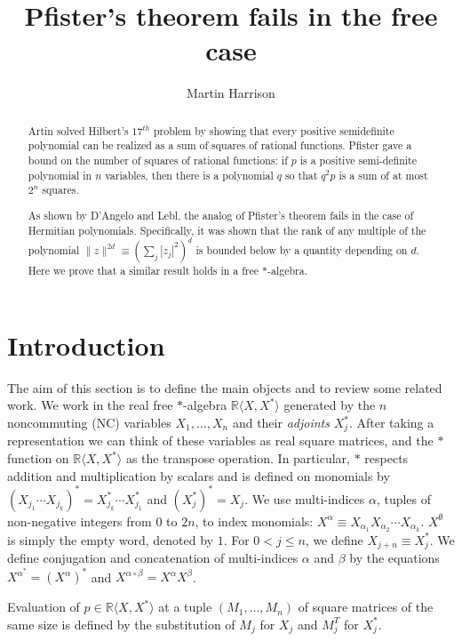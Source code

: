 \documentclass[11pt]{amsart}
\title{Pfister's theorem fails in the free case}
\author{Martin Harrison}
\begin{document}
\begin{abstract}
Artin solved Hilbert's $17^{th}$ problem by showing that every positive semidefinite polynomial can be realized as a sum of squares of rational functions. Pfister gave a bound on the number of squares of rational functions:  if $p$ is a positive semi-definite polynomial in $n$ variables, then there is a polynomial $q$ so that $q^2p$ is a sum of at most $2^n$ squares.

As shown by D'Angelo and Lebl, the analog of Pfister's theorem fails in the case of Hermitian polynomials.  Specifically, it was shown that the rank of any multiple of the polynomial $\|z\|^{2d} \equiv (\sum_j |z_j|^2)^d$ is bounded below by a quantity depending on $d$.  Here we prove that a similar result holds in a free $\ast$-algebra.
\end{abstract}
\maketitle
\section{Introduction}
The aim of this section is to define the main objects and to review some related work.  We work in the real free $\ast$-algebra $\mathbb{R}\langle X, X^* \rangle$ generated by the $n$ noncommuting (NC) variables $X_1, \ldots, X_n$ and their \emph{adjoints} $X_j^*$.  After taking a representation we can think of these variables as real square matrices, and the $\ast$ function on $\mathbb{R}\langle X, X^* \rangle$ as the transpose operation.  In particular, $\ast$ respects addition and multiplication by scalars and is defined on monomials by $(X_{j_1} \cdots X_{j_k}) ^*= X_{j_k}^* \cdots X_{j_1}^*$ and $(X_j^*)^*=X_j$.  We use multi-indices $\alpha$, tuples of non-negative integers from $0$ to $2n$, to index monomials: $X^\alpha \equiv X_{\alpha_1}X_{\alpha_2} \cdots X_{\alpha_k}$.  $X^\emptyset$ is simply the empty word, denoted by $1$.  For $0<j\leq n$, we define $X_{j+n} \equiv X_j^*$.  We define conjugation and concatenation of multi-indices $\alpha$ and $\beta$ by the equations $X^{\alpha^*}=(X^\alpha)^*$ and $X^{\alpha \circ \beta}  = X^{\alpha} X^{\beta}$.

Evaluation of $p \in \mathbb{R}\langle X, X^* \rangle$ at a tuple $(M_1, \ldots, M_n)$ of square matrices of the same size is defined by the substitution of $M_j$ for $X_j$ and $M_j^T$ for $X_j^*$.
\end{document}
